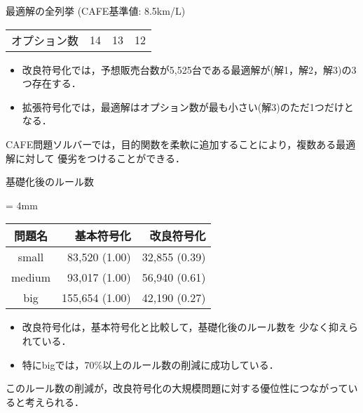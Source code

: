 \documentclass[dvipdfmx, 11pt]{beamer}
\begin{document}
\begin{frame}{最適解の全列挙 {\normalsize (CAFE基準値: 8.5km/L)}}
\begin{exampleblock}{}
\begin{tabular}{l|l|c|c|c||c|c|c||c|c|c}
    \multicolumn{2}{l|}{オプション数}  & \multicolumn{3}{c||}{14} & \multicolumn{3}{c||}{13}  &\multicolumn{3}{c}{\alert{12}}\\ 
  \end{tabular}
 \end{exampleblock}
 \begin{itemize}
  \item 改良符号化では，予想販売台数が5,525台である最適解が(解1，解2，解3)の3つ存在する．
  \item 拡張符号化では，最適解はオプション数が最も小さい(解3)のただ1つだけとなる．
 \end{itemize}
 \begin{alertblock}{}
  CAFE問題ソルバーでは，目的関数を柔軟に追加することにより，複数ある最適解に対して
  優劣をつけることができる．
 \end{alertblock}
\end{frame}
\begin{frame}{基礎化後のルール数}
 \begin{exampleblock}{}\centering 
  \renewcommand{\arraystretch}{1.2}
  \tabcolsep = 4mm
  \begin{tabular}{crr} 
   問題名    & 基本符号化       & 改良符号化    \\ \hline
   small    &  83,520 (1.00)  & 32,855 (0.39) \\ 
   medium   &  93,017 (1.00)  & 56,940 (0.61) \\
   big	    & 155,654 (1.00)  & 42,190 (0.27) \\ 
  \end{tabular}
 \end{exampleblock}
 \begin{itemize}
  \item 改良符号化は，基本符号化と比較して，基礎化後のルール数を
	少なく抑えられている．
  \item 特にbigでは，70\%以上のルール数の削減に成功している．
 \end{itemize}
 \begin{alertblock}{}
  このルール数の削減が，改良符号化の大規模問題に対する優位性につながっていると考えられる．
 \end{alertblock}
\end{frame}
\end{document}
